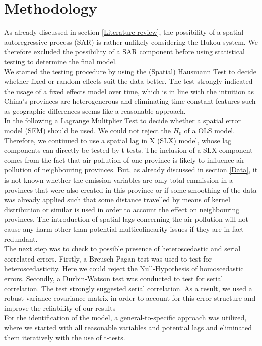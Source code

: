 \documentclass[
]{article}
\begin{document}
\section{Methodology}
As already discussed in section \ref{Literature review}, the possibility of a spatial autoregressive process (SAR) is rather unlikely considering the Hukou system. We therefore excluded the possibility of a SAR component before using statistical testing to determine the final model.\\
We started the testing procedure by using the (Spatial) Hausmann Test to decide whether fixed or random effects suit the data better. The test strongly indicated the usage of a fixed effects model over time, which is in line with the intuition as China's provinces are heterogenerous and eliminating time constant features such as geographic differences seems like a reasonable approach.\\
In the following a Lagrange Mulitplier Test to decide whether a spatial error model (SEM) should be used. We could not reject the $H_0$ of a OLS model. Therefore, we continued to use a spatial lag in X (SLX) model, whose lag components can directly be tested by t-tests. The inclusion of a SLX component comes from the fact that air pollution of one province is likely to influence air pollution of neighbouring provinces. But, as already discussed in section \ref{Data}, it is not known whether the emission variables are only total emmission in a provinces that were also created in this province or if some smoothing of the data was already applied such that some distance travelled by means of kernel distribution or similar is used in order to account the effect on neighbouring provinces. The introduction of spatial lags concerning the air pollution will not cause any harm other than potential multicolinearity issues if they are in fact redundant.\\
The next step was to check to possible presence of heteroscedastic and serial correlated errors. Firstly, a Breusch-Pagan test was used to test for heteroscedasticity. Here we could reject the Null-Hypothesis of homoscedastic errors. Secondly, a Durbin-Watson test was conducted to test for serial correlation. The test strongly suggested serial correlation. As a result, we used a robust variance covariance matrix in order to account for this error structure and improve the reliability of our results\\
For the identification of the model, a general-to-specific approach was utilized, where we started with all reasonable variables and potential lags and eliminated them iteratively with the use of t-tests.\\
\end{document}

